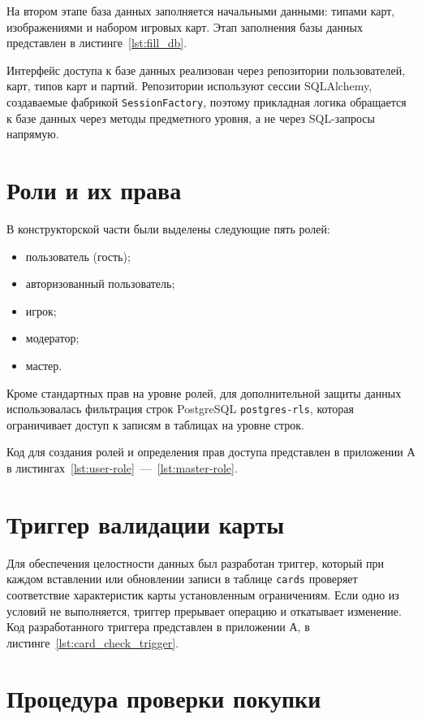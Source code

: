 На втором этапе база данных заполняется начальными данными: типами карт,
изображениями и набором игровых карт. Этап заполнения базы данных представлен в
листинге~\ref{lst:fill_db}.

Интерфейс доступа к базе данных реализован через репозитории пользователей,
карт, типов карт и партий. Репозитории используют сессии SQLAlchemy,
создаваемые фабрикой \texttt{SessionFactory}, поэтому прикладная логика
обращается к базе данных через методы предметного уровня, а не через
SQL-запросы напрямую.

\section{Роли и их права}
В конструкторской части были выделены следующие пять ролей:
\begin{itemize}
	\item пользователь (гость);
	\item авторизованный пользователь;
	\item игрок;
	\item модератор;
	\item мастер.
\end{itemize}

Кроме стандартных прав на уровне ролей, для дополнительной защиты данных
использовалась фильтрация строк PostgreSQL \texttt{postgres-rls}, которая
ограничивает доступ к записям в таблицах на уровне строк.

Код для создания ролей и определения прав доступа представлен в приложении А в
листингах~\ref{lst:user-role}~---~\ref{lst:master-role}.

\section{Триггер валидации карты}

Для обеспечения целостности данных был разработан триггер, который при каждом
вставлении или обновлении записи в таблице \texttt{cards} проверяет
соответствие характеристик карты установленным ограничениям. Если одно из
условий не выполняется, триггер прерывает операцию и откатывает изменение.
Код разработанного триггера представлен в приложении А, в
листинге~\ref{lst:card_check_trigger}.

\section{Процедура проверки покупки}

